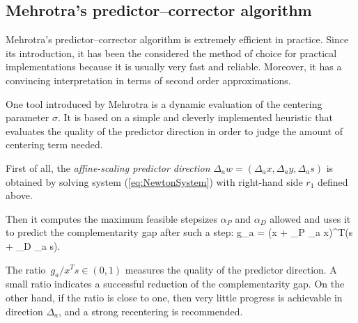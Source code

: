 %
%
\subsection{Mehrotra's predictor--corrector algorithm}
\label{sec:MehrotraPC}

Mehrotra's predictor--corrector algorithm \cite{Mehrotra92,LustigMarstenShanno}
is extremely efficient in practice. Since its introduction, it has 
been the considered the method of choice for practical implementations 
because it is usually very fast and reliable. Moreover, it has a 
convincing interpretation in terms of second order approximations.



One tool introduced by Mehrotra \cite{Mehrotra92} is a dynamic evaluation 
of the centering parameter $\sigma$. It is based on a simple and cleverly 
implemented heuristic that evaluates the quality of the predictor direction
in order to judge the amount of centering term needed.

First of all, the {\em affine-scaling predictor direction} 
$\Delta_a w = (\Delta_a x, \Delta_a y, \Delta_a s)$ is obtained by solving 
system (\ref{eq:NewtonSystem}) with right-hand side $r_1$ defined above.

Then it computes the maximum feasible stepsizes $\alpha_P$ and $\alpha_D$ 
allowed and uses it to predict the complementarity gap after such a step:
\be \label{eq:PredictedGap}
  g_a = (x + \alpha_P \Delta_a x)^T(s + \alpha_D \Delta_a s).
\ee

The ratio $\,g_a / x^{T}s \in (0,1)$ measures the quality of the 
predictor direction.
A small ratio indicates a successful reduction of the complementarity 
gap. On the other hand, if the ratio is close to one, then very little 
progress is achievable in direction $\Delta_a$, and a strong recentering 
is recommended.

